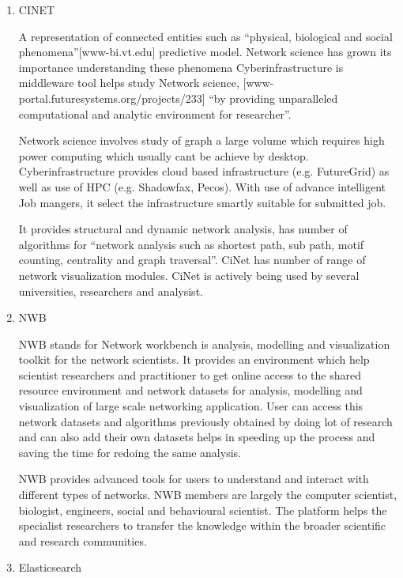 \begin{enumerate}
\item {} 
CINET

A representation of connected entities such as “physical,
biological and social phenomena”{[}www-bi.vt.edu{]} predictive
model. Network science has grown its importance understanding
these phenomena Cyberinfrastructure is middleware tool helps study
Network science, {[}www-portal.futuresystems.org/projects/233{]}
“by providing unparalleled computational and analytic environment
for researcher”.

Network science involves study of graph a large volume which
requires high power computing which usually cant be achieve by
desktop. Cyberinfrastructure provides cloud based infrastructure
(e.g. FutureGrid) as well as use of HPC (e.g. Shadowfax,
Pecos). With use of advance intelligent Job mangers, it select the
infrastructure smartly suitable for submitted job.

It provides structural and dynamic network analysis, has number of
algorithms for “network analysis such as shortest path, sub path,
motif counting, centrality and graph traversal”. CiNet has number
of range of network visualization modules.  CiNet is actively
being used by several universities, researchers and analysist.

\item {} 
NWB

\label{\detokenize{i524/technologies:id131}}{\hyperref[\detokenize{i524/technologies:www-nwb-edu}]{\sphinxcrossref{{[}113{]}}}} NWB stands for Network workbench is analysis,
modelling and visualization toolkit for the network scientists.
It provides an environment which help scientist researchers and
practitioner to get online access to the shared resource
environment and network datasets for analysis, modelling and
visualization of large scale networking application.  User can
access this network datasets and algorithms previously obtained by
doing lot of research and can also add their own datasets helps in
speeding up the process and saving the time for redoing the same
analysis.

NWB provides advanced tools for users to understand and interact
with different types of networks.  NWB members are largely the
computer scientist, biologist, engineers, social and behavioural
scientist. The platform helps the specialist researchers to
transfer the knowledge within the broader scientific and research
communities.

\item {} 
Elasticsearch


\end{enumerate}
